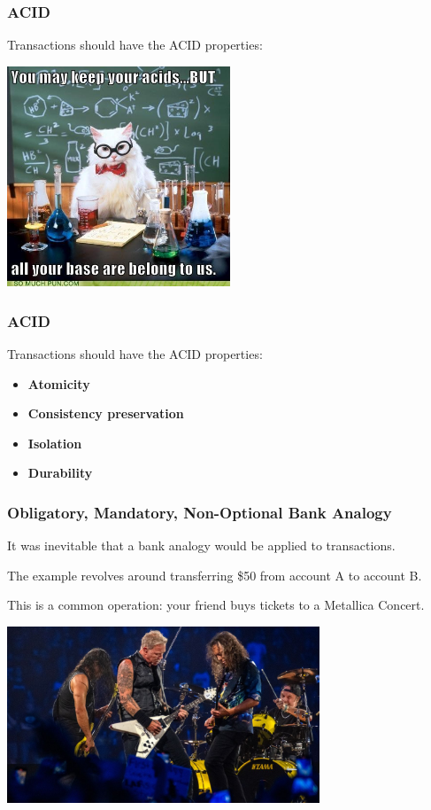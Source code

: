 \begin{frame}
\frametitle{ACID}
Transactions should have the \alert{ACID} properties:

\begin{center}
	\includegraphics[width=0.5\textwidth]{images/acid.jpg}
\end{center}

\end{frame}

\begin{frame}
\frametitle{ACID}
Transactions should have the \alert{ACID} properties:
\begin{itemize}
	\item \textbf{Atomicity}
	\item \textbf{Consistency preservation}
	\item \textbf{Isolation}
	\item \textbf{Durability}
\end{itemize}
\end{frame}


\begin{frame}
\frametitle{Obligatory, Mandatory, Non-Optional Bank Analogy}

It was inevitable that a bank analogy would be applied to transactions. 

The example revolves around transferring \$50 from account A to account B. 

This is a common operation: your friend buys tickets to a Metallica Concert.

\begin{center}
	\includegraphics[width=0.7\textwidth]{images/metallica.jpg}
\end{center}


\end{frame}



